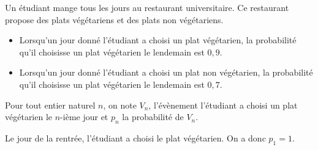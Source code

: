 \medskip

Un étudiant mange tous les jours au restaurant universitaire. Ce restaurant propose des plats végétariens et des plats non végétariens.

\begin{itemize}[label=$\bullet~~$]
\item Lorsqu'un jour donné l'étudiant a choisi un plat végétarien, la probabilité qu'il choisisse un plat végétarien le lendemain est $0,9$.
\item Lorsqu'un jour donné l'étudiant a choisi un plat non végétarien, la probabilité qu'il choisisse un plat végétarien le lendemain est $0,7$.
\end{itemize}

\medskip

Pour tout entier naturel $n$, on note $V_n$, l'évènement \og l'étudiant a choisi un plat végétarien le $n$-ième jour \fg{} et $p_n$ la probabilité de $V_n$.

Le jour de la rentrée, l'étudiant a choisi le plat végétarien. On a donc $p_1 = 1$.



